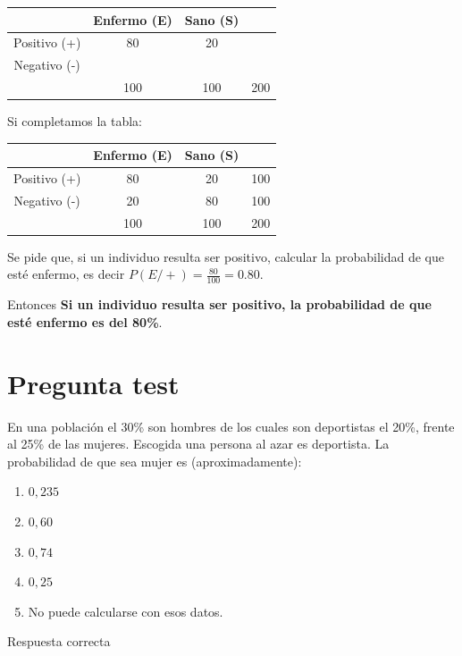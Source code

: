\documentclass[
]{book}
\providecommand{\tightlist}{%
  \setlength{\itemsep}{0pt}\setlength{\parskip}{0pt}}
\begin{document}
\begin{longtable}[]{@{}cccc@{}}
\toprule
& Enfermo (E) & Sano (S) &\tabularnewline
\midrule
\endhead
Positivo (+) & 80 & 20 &\tabularnewline
Negativo (-) & & &\tabularnewline
& 100 & 100 & 200\tabularnewline
\bottomrule
\end{longtable}

Si completamos la tabla:

\begin{longtable}[]{@{}cccc@{}}
\toprule
& Enfermo (E) & Sano (S) &\tabularnewline
\midrule
\endhead
Positivo (+) & 80 & 20 & 100\tabularnewline
Negativo (-) & 20 & 80 & 100\tabularnewline
& 100 & 100 & 200\tabularnewline
\bottomrule
\end{longtable}

Se pide que, si un individuo resulta ser positivo, calcular la probabilidad de que esté enfermo, es decir \(P(E/+)= \frac{80}{100}=0.80\).

Entonces \textbf{Si un individuo resulta ser positivo, la probabilidad de que esté enfermo es del 80\%}.

\hypertarget{pregunta-test-165}{%
\section{Pregunta test}\label{pregunta-test-165}}

En una población el 30\% son hombres de los cuales son deportistas el 20\%, frente al 25\% de las mujeres. Escogida una persona al azar es deportista. La probabilidad de que sea mujer es (aproximadamente):

\begin{enumerate}
\def\labelenumi{\alph{enumi})}
\tightlist
\item
  \(0,235\)
\item
  \(0,60\)
\item
  \(0,74\)
\item
  \(0,25\)
\item
  No puede calcularse con esos datos.
\end{enumerate}

Respuesta correcta

  
\end{document}
